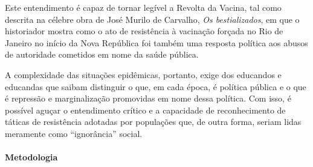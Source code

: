 \documentclass[12pt]{extarticle}
\begin{document}
Este entendimento é capaz de tornar legível a Revolta da Vacina, tal
como descrita na célebre obra de José Murilo de Carvalho, \emph{Os
bestializados}, em que o historiador mostra como o ato de resistência à
vacinação forçada no Rio de Janeiro no início da Nova República foi
também uma resposta política aos abusos de autoridade cometidos em nome
da saúde pública.

A complexidade das situações epidêmicas, portanto, exige dos educandos e
educandas que saibam distinguir o que, em cada época, é política pública
e o que é repressão e marginalização promovidas em nome dessa política.
Com isso, é possível aguçar o entendimento crítico e a capacidade de
reconhecimento de táticas de resistência adotadas por populações que, de
outra forma, seriam lidas meramente como ``ignorância'' social.

\paragraph{Metodologia}
\end{document}
